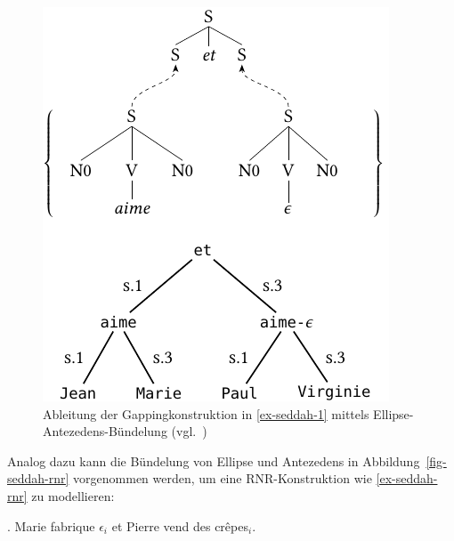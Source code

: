 \begin{figure}[t]
\centering
\includegraphics{graphics/abb811.pdf}
\caption{\label{fig-seddah-1}Ableitung der Gappingkonstruktion in \ref{ex-seddah-1} mittels Ellipse-Antezedens-Bündelung (vgl.\ \citealt[Figure~1]{Seddah:etal:10})}
\end {figure}


Analog dazu kann die Bündelung von Ellipse und Antezedens in Abbildung~\ref{fig-seddah-rnr} vorgenommen werden, um eine RNR-Konstruktion wie \ref{ex-seddah-rnr} zu modellieren:  

\ex. \label{ex-seddah-rnr}  Marie fabrique $\epsilon_i$ et Pierre vend des cr\^{e}pes$_i$. \hfill \citep[(2)]{Seddah:etal:10}

